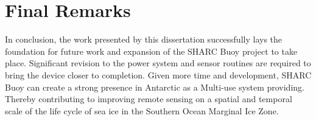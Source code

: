\pagebreak
\section{Final Remarks}
In conclusion, the work presented by this dissertation successfully lays the foundation for future work and expansion of the SHARC Buoy project to take place. Significant revision to the power system and sensor routines are required to bring the device closer to completion. Given more time and development, SHARC Buoy can create a strong presence in Antarctic as a Multi-use system providing. Thereby contributing to improving remote sensing on a spatial and temporal scale of the life cycle of sea ice in the Southern Ocean Marginal Ice Zone.